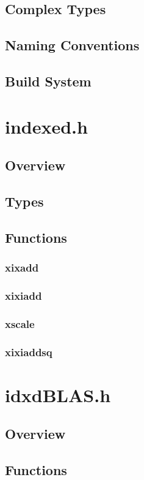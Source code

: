 \documentclass[12pt]{article}
\theoremstyle{plain}
\begin{document}
  \subsection{Complex Types}
  \subsection{Naming Conventions}
  \subsection{Build System}
\section{indexed.h}
  \subsection{Overview}
  \subsection{Types}
  \subsection{Functions}
    \subsubsection{xixadd}
    \subsubsection{xixiadd}
    \subsubsection{xscale}
    \subsubsection{xixiaddsq}
\section{idxdBLAS.h}
  \subsection{Overview}
  \subsection{Functions}
\end{document}
